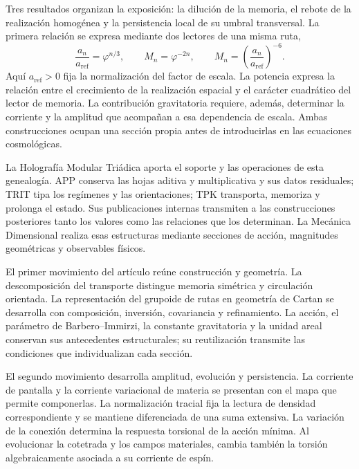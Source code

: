 Tres resultados organizan la exposición: la dilución de la memoria, el
rebote de la realización homogénea y la persistencia local de su umbral
transversal. La primera relación se expresa mediante dos lectores de una
misma ruta,
\begin{equation}
 \frac{a_n}{a_{\mathrm{ref}}}=\varphi^{n/3},
 \qquad M_n=\varphi^{-2n},
 \qquad
 M_n=\left(\frac{a_n}{a_{\mathrm{ref}}}\right)^{-6}.
 \label{vii:eq:programa-dilucion}
\end{equation}
Aquí \(a_{\mathrm{ref}}>0\) fija la normalización del factor de escala.
La potencia expresa la relación entre el crecimiento de la realización
espacial y el carácter cuadrático del lector de memoria. La contribución
gravitatoria requiere, además, determinar la corriente y la amplitud que
acompañan a esa dependencia de escala. Ambas construcciones ocupan una
sección propia antes de introducirlas en las ecuaciones cosmológicas.

La Holografía Modular Triádica aporta el soporte y las operaciones de esta
genealogía. APP conserva las hojas aditiva y multiplicativa y sus datos
residuales; TRIT tipa los regímenes y las orientaciones; TPK transporta,
memoriza y prolonga el estado. Sus publicaciones internas transmiten a
las construcciones posteriores tanto los valores como las relaciones que
los determinan. La Mecánica Dimensional realiza esas estructuras mediante
secciones de acción, magnitudes geométricas y observables físicos.

El primer movimiento del artículo reúne construcción y geometría. La
descomposición del transporte distingue memoria simétrica y circulación
orientada. La representación del grupoide de rutas en geometría de Cartan
se desarrolla con composición, inversión, covariancia y refinamiento. La
acción, el parámetro de Barbero--Immirzi, la constante gravitatoria y la
unidad areal conservan sus antecedentes estructurales; su reutilización
transmite las condiciones que individualizan cada sección.

El segundo movimiento desarrolla amplitud, evolución y persistencia.
La corriente de pantalla y la corriente variacional de materia se
presentan con el mapa que permite componerlas. La normalización tracial
fija la lectura de densidad correspondiente y se mantiene diferenciada de
una suma extensiva. La variación de la conexión determina la respuesta
torsional de la acción mínima. Al evolucionar la cotetrada y los campos
materiales, cambia también la torsión algebraicamente asociada a su
corriente de espín.

